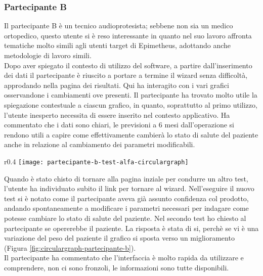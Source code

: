 \subsubsection{Partecipante B}
\label{partecipante-b}
Il partecipante B è un tecnico audioprotesista; sebbene non sia un medico ortopedico, questo utente si è reso interessante in quanto nel suo lavoro affronta tematiche molto simili agli utenti target di Epimetheus, adottando anche metodologie di lavoro simili.\\
Dopo aver spiegato il contesto di utilizzo del software, a partire dall'inserimento dei dati il partecipante è riuscito a portare a termine il wizard senza difficoltà, approdando nella pagina dei risultati. Qui ha interagito con i vari grafici osservandone i cambiamenti ove presenti. Il partecipante ha trovato molto utile la spiegazione contestuale a ciascun grafico, in quanto, soprattutto al primo utilizzo, l'utente inesperto necessita di essere inserito nel contesto applicativo. Ha commentato che i dati sono chiari, le previsioni a 6 mesi dall'operazione si rendono utili a capire come effettivamente cambierà lo stato di salute del paziente anche in relazione al cambiamento dei parametri modificabili. \\

\begin{wrapfigure}{r}{0.4\textwidth}
    \centering
    \texttt{[image: partecipante-b-test-alfa-circulargraph]}
    \caption{Circulargraph del test Alfa condotto dal partecipante B}
    \caption*{In questo test si è indagato l'ambito dell'operazione all'anca}
    \label{fig:circulargraph-partecipante-b}
\end{wrapfigure}

Quando è stato chisto di tornare alla pagina inziale per condurre un altro test, l'utente ha individuato subito il link per tornare al wizard. Nell'eseguire il nuovo test si è notato come il partecipante aveva già assunto confidenza col prodotto, andando spontaneamente a modificare i parametri necessari per indagare come potesse cambiare lo stato di salute del paziente. Nel secondo test ho chiesto al partecipante se opererebbe il paziente. La risposta è stata di si, perchè se vi è una variazione del peso del paziente il grafico si sposta verso un miglioramento (Figura \ref{fig:circulargraph-partecipante-b}). \\
Il partecipante ha commentato che l'interfaccia è molto rapida da utilizzare e comprendere, non ci sono fronzoli, le informazioni sono tutte disponibili. \\

